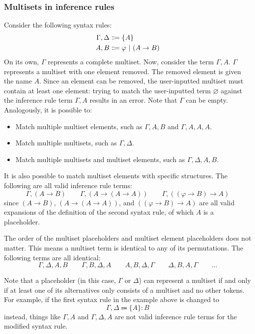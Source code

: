 \subsubsection{Multisets in inference rules}
\label{inference:multisets}
Consider the following syntax rules:
\begin{align*}
    \Gamma, \Delta &\Coloneqq \{ A \} \\
    A, B &\Coloneqq \varphi \ |\  (A \to B)
\end{align*}
On its own, $\Gamma$ represents a complete multiset. Now, consider the term $\Gamma, A$. $\Gamma$ represents a multiset with one element removed. The removed element is given the name $A$. Since an element can be removed, the user-inputted multiset must contain at least one element: trying to match the user-inputted term $\varnothing$ against the inference rule term $\Gamma, A$ results in an error. Note that $\Gamma$ can be empty. Analogously, it is possible to:
\begin{itemize}
    \item Match multiple multiset elements, such as $\Gamma, A, B$ and $\Gamma, A, A, A$.
    \item Match multiple multisets, such as $\Gamma, \Delta$.
    \item Match multiple multisets and multiset elements, such as $\Gamma, \Delta, A, B$.
\end{itemize}

It is also possible to match multiset elements with specific structures. The following are all valid inference rule terms:
\[
    \Gamma, (A \to B) \qquad \Gamma, (A \to (A \to A)) \qquad \Gamma, ((\varphi \to B) \to A)
\]
since $(A \to B)$, $(A \to (A \to A))$, and $((\varphi \to B) \to A)$ are all valid expansions of the definition of the second syntax rule, of which $A$ is a placeholder.

The order of the multiset placeholders and multiset element placeholders does not matter. This means a multiset term is identical to any of its permutations. The following terms are all identical:
\[
    \Gamma, \Delta, A, B \qquad \Gamma, B, \Delta, A \qquad A, B, \Delta, \Gamma \qquad \Delta, B, A, \Gamma \qquad \ldots
\]

Note that a placeholder (in this case, $\Gamma$ or $\Delta$) can represent a multiset if and only if at least one of its alternatives only consists of a multiset and no other tokens. For example, if the first syntax rule in the example above is changed to
\[
    \Gamma, \Delta \Coloneqq \{ A \}: B
\]
instead, things like $\Gamma, A$ and $\Gamma, \Delta, A$ are not valid inference rule terms for the modified syntax rule. 
